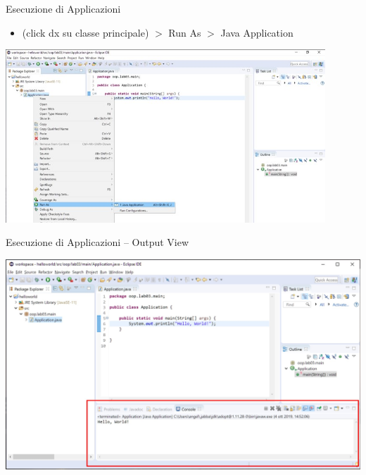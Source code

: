\documentclass[xcolor=dvipsnames,presentation]{beamer}
\begin{document}
\begin{frame}{Esecuzione di Applicazioni}
\begin{itemize}
\item (click dx su classe principale) $>$ Run As $>$ Java Application
\end{itemize}
\begin{center}
\includegraphics[width=0.9\textwidth]{img/eclipse-screenshots/eclipse-ide-04b.jpg}
\end{center}
\end{frame}

\begin{frame}{Esecuzione di Applicazioni -- Output View}
\begin{center}
\includegraphics[width=\textwidth]{img/eclipse-screenshots/eclipse-ide-04c.jpg}
\end{center}
\end{frame}
\end{document}
